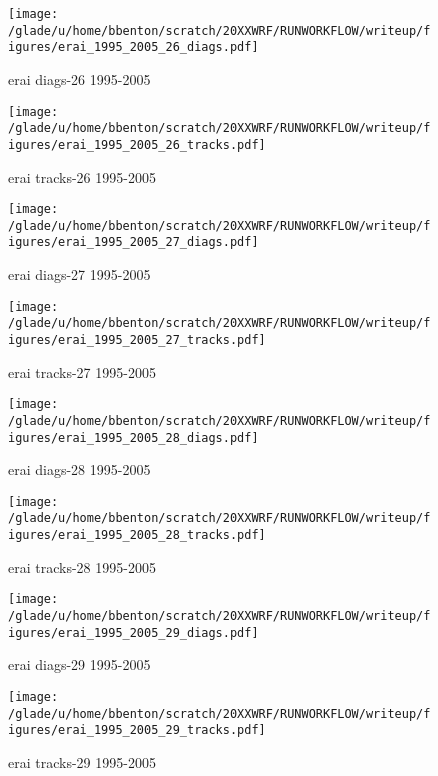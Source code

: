 \begin{figure}[!tbp]
\centering
\begin{minipage}[b]{0.45\textwidth}
\texttt{[image: /glade/u/home/bbenton/scratch/20XXWRF/RUNWORKFLOW/writeup/figures/erai\_1995\_2005\_26\_diags.pdf]}
\caption{erai diags-26 1995-2005}
\end{minipage}
\hfill
\begin{minipage}[b]{0.45\textwidth}
\texttt{[image: /glade/u/home/bbenton/scratch/20XXWRF/RUNWORKFLOW/writeup/figures/erai\_1995\_2005\_26\_tracks.pdf]}
\caption{erai tracks-26 1995-2005}
\end{minipage}
\end{figure}
\begin{figure}[!tbp]
\centering
\begin{minipage}[b]{0.45\textwidth}
\texttt{[image: /glade/u/home/bbenton/scratch/20XXWRF/RUNWORKFLOW/writeup/figures/erai\_1995\_2005\_27\_diags.pdf]}
\caption{erai diags-27 1995-2005}
\end{minipage}
\hfill
\begin{minipage}[b]{0.45\textwidth}
\texttt{[image: /glade/u/home/bbenton/scratch/20XXWRF/RUNWORKFLOW/writeup/figures/erai\_1995\_2005\_27\_tracks.pdf]}
\caption{erai tracks-27 1995-2005}
\end{minipage}
\end{figure}
\begin{figure}[!tbp]
\centering
\begin{minipage}[b]{0.45\textwidth}
\texttt{[image: /glade/u/home/bbenton/scratch/20XXWRF/RUNWORKFLOW/writeup/figures/erai\_1995\_2005\_28\_diags.pdf]}
\caption{erai diags-28 1995-2005}
\end{minipage}
\hfill
\begin{minipage}[b]{0.45\textwidth}
\texttt{[image: /glade/u/home/bbenton/scratch/20XXWRF/RUNWORKFLOW/writeup/figures/erai\_1995\_2005\_28\_tracks.pdf]}
\caption{erai tracks-28 1995-2005}
\end{minipage}
\end{figure}
\begin{figure}[!tbp]
\centering
\begin{minipage}[b]{0.45\textwidth}
\texttt{[image: /glade/u/home/bbenton/scratch/20XXWRF/RUNWORKFLOW/writeup/figures/erai\_1995\_2005\_29\_diags.pdf]}
\caption{erai diags-29 1995-2005}
\end{minipage}
\hfill
\begin{minipage}[b]{0.45\textwidth}
\texttt{[image: /glade/u/home/bbenton/scratch/20XXWRF/RUNWORKFLOW/writeup/figures/erai\_1995\_2005\_29\_tracks.pdf]}
\caption{erai tracks-29 1995-2005}
\end{minipage}
\end{figure}
